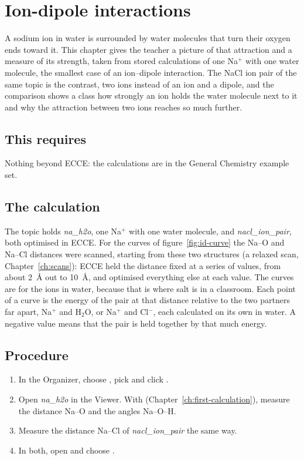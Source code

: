 \chapter{Ion-dipole interactions}
\label{ch:t-ion-dipole}

A sodium ion in water is surrounded by water molecules that turn their oxygen ends toward it. This chapter gives the teacher a picture of that attraction and a measure of its strength, taken from stored calculations of one Na$^+$ with one water molecule, the smallest case of an ion--dipole interaction. The NaCl ion pair of the same topic is the contrast, two ions instead of an ion and a dipole, and the comparison shows a class how strongly an ion holds the water molecule next to it and why the attraction between two ions reaches so much further.

\section*{This requires}
Nothing beyond ECCE: the calculations are in the General Chemistry example set.

\section{The calculation}
The topic  holds \emph{na\_h2o}, one Na$^+$ with one water molecule, and \emph{nacl\_ion\_pair}, both optimised in ECCE. For the curves of figure~\ref{fig:id-curve} the Na--O and Na--Cl distances were scanned, starting from these two structures (a relaxed scan, Chapter~\ref{ch:scans}): ECCE held the distance fixed at a series of values, from about \SI{2}{\angstrom} out to \SI{10}{\angstrom}, and optimised everything else at each value. The curves are for the ions in water, because that is where salt is in a classroom. Each point of a curve is the energy of the pair at that distance relative to the two partners far apart, Na$^+$ and H$_2$O, or Na$^+$ and Cl$^-$, each calculated on its own in water. A negative value means that the pair is held together by that much energy.

\section{Procedure}
\begin{enumerate}
	\item In the Organizer, choose , pick  and click .
	\item Open \emph{na\_h2o} in the Viewer. With  (Chapter~\ref{ch:first-calculation}), measure the distance Na--O and the angles Na--O--H.
	\item Measure the distance Na--Cl of \emph{nacl\_ion\_pair} the same way.
	\item In both, open  and choose .
\end{enumerate}

